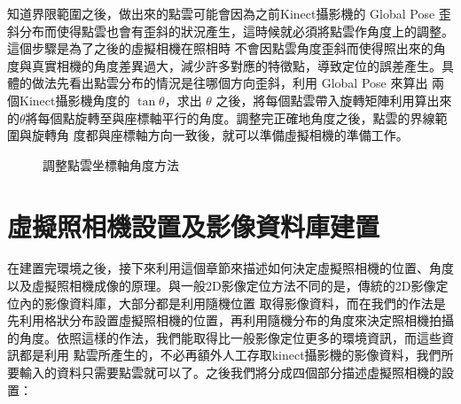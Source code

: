     知道界限範圍之後，做出來的點雲可能會因為之前Kinect攝影機的 Global Pose 歪斜分布而使得點雲也會有歪斜的狀況產生，這時候就必須將點雲作角度上的調整。這個步驟是為了之後的虛擬相機在照相時
    不會因點雲角度歪斜而使得照出來的角度與真實相機的角度差異過大，減少許多對應的特徵點，導致定位的誤差產生。具體的做法先看出點雲分布的情況是往哪個方向歪斜，利用 Global Pose 來算出
    兩個Kinect攝影機角度的 $\tan \theta$，求出 $\theta$ 之後，將每個點雲帶入旋轉矩陣利用算出來的$\theta$將每個點旋轉至與座標軸平行的角度。調整完正確地角度之後，點雲的界線範圍與旋轉角
    度都與座標軸方向一致後，就可以準備虛擬相機的準備工作。

    
    
\begin{figure}
  \begin{center}
  \end{center}
  \caption{調整點雲坐標軸角度方法 }
  \label{fig:rotate axis}
\end{figure}
    
\section{虛擬照相機設置及影像資料庫建置}
	
	在建置完環境之後，接下來利用這個章節來描述如何決定虛擬照相機的位置、角度以及虛擬照相機成像的原理。與一般2D影像定位方法不同的是，傳統的2D影像定位內的影像資料庫，大部分都是利用隨機位置
	取得影像資料，而在我們的作法是先利用格狀分布設置虛擬照相機的位置，再利用隨機分布的角度來決定照相機拍攝的角度。依照這樣的作法，我們能取得比一般影像定位更多的環境資訊，而這些資訊都是利用
	點雲所產生的，不必再額外人工存取kinect攝影機的影像資料，我們所要輸入的資料只需要點雲就可以了。之後我們將分成四個部分描述虛擬照相機的設置：
	
